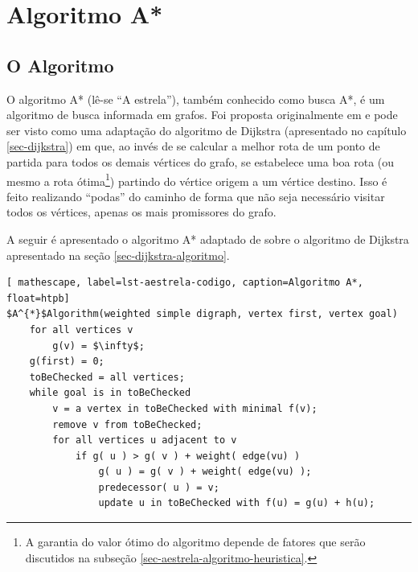 \chapter{Algoritmo A*}
\label{sec-aestrela}

\section{O Algoritmo}
\label{sec-aestrela-algoritmo}
O algoritmo A* (lê-se ``A estrela''), também conhecido como busca A*, é um algoritmo de busca informada em grafos. Foi proposta originalmente em  e pode ser visto como uma adaptação do algoritmo de Dijkstra (apresentado no capítulo \ref{sec-dijkstra}) em que, ao invés de se calcular a melhor rota de um ponto de partida para todos os demais vértices do grafo, se estabelece uma boa rota (ou mesmo a rota ótima\footnote{A garantia do valor ótimo do algoritmo depende de fatores que serão discutidos na subseção \ref{sec-aestrela-algoritmo-heuristica}.}) partindo do vértice origem a um vértice destino. Isso é feito realizando ``podas'' do caminho de forma que não seja necessário visitar todos os vértices, apenas os mais promissores do grafo.

A seguir é apresentado o algoritmo A* adaptado de  sobre o algoritmo de Dijkstra apresentado na seção \ref{sec-dijkstra-algoritmo}. 

\begin{lstlisting}[ mathescape, label=lst-aestrela-codigo, caption=Algoritmo A*, float=htpb]
$A^{*}$Algorithm(weighted simple digraph, vertex first, vertex goal)
	for all vertices v
		g(v) = $\infty$;
	g(first) = 0;
	toBeChecked = all vertices;
	while goal is in toBeChecked
		v = a vertex in toBeChecked with minimal f(v);
		remove v from toBeChecked;
		for all vertices u adjacent to v
			if g( u ) > g( v ) + weight( edge(vu) )
				g( u ) = g( v ) + weight( edge(vu) );
				predecessor( u ) = v;
				update u in toBeChecked with f(u) = g(u) + h(u);
\end{lstlisting}

